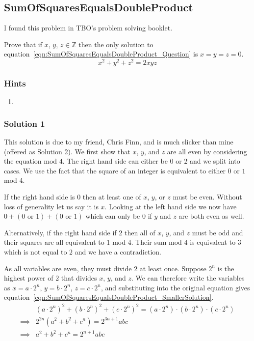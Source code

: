 \subsection{SumOfSquaresEqualsDoubleProduct}

I found this problem in TBO's problem solving booklet.

Prove that if $x$, $y$, $z \in \mathbb{Z}$ then the only solution to equation~\eqref{eqn:SumOfSquaresEqualsDoubleProduct_Question} is $x = y = z = 0$.
\begin{equation}
	x^2 + y^2 + z^2 = 2xyz
	\label{eqn:SumOfSquaresEqualsDoubleProduct_Question}
\end{equation}

\subsubsection{Hints}

\begin{enumerate}
	\item 
\end{enumerate}

\subsubsection{Solution 1}

This solution is due to my friend, Chris Finn, and is much slicker than mine (offered as Solution 2). We first show that $x$, $y$, and $z$ are all even by considering the equation mod $4$. The right hand side can either be $0$ or $2$ and we split into cases. We use the fact that the square of an integer is equivalent to either $0$ or $1$ mod 4.

If the right hand side is $0$ then at least one of $x$, $y$, or $z$ must be even. Without loss of generality let us say it is $x$. Looking at the left hand side we now have $0 + (0 \text{ or } 1) + (0 \text{ or } 1)$ which can only be 0 if $y$ and $z$ are both even as well.

Alternatively, if the right hand side if $2$ then all of $x$, $y$, and $z$ must be odd and their squares are all equivalent to $1$ mod $4$. Their sum mod $4$ is equivalent to $3$ which is not equal to $2$ and we have a contradiction.

As all variables are even, they must divide $2$ at least once. Suppose $2^n$ is the highest power of $2$ that divides $x$, $y$, and $z$. We can therefore write the variables as $x = a \cdot 2^{n}$, $y = b \cdot 2^{n}$, $z = c \cdot 2^{n}$, and substituting into the original equation gives equation~\eqref{eqn:SumOfSquaresEqualsDoubleProduct_SmallerSolution}.
\begin{align}
	& (a \cdot 2^n)^2 + (b \cdot 2^n)^2 + (c \cdot 2^n)^2 = (a \cdot 2^n) \cdot (b \cdot 2^n) \cdot (c \cdot 2^n) \\
	\implies& 2^{2n} \left( a^2 + b^2 + c^n \right) = 2^{3n + 1} abc \\
	\implies& a^2 + b^2 + c^n = 2^{n+1} abc
	\label{eqn:SumOfSquaresEqualsDoubleProduct_SmallerSolution}
\end{align}

